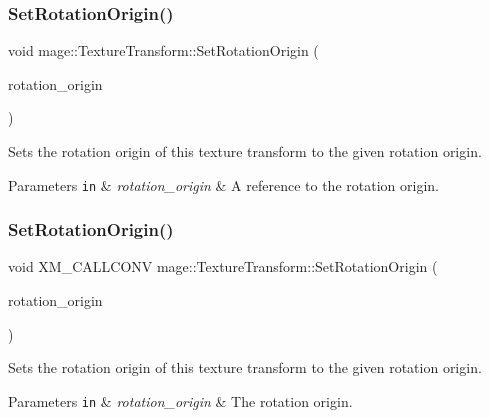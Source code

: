 \subsubsection{\texorpdfstring{Set\+Rotation\+Origin()}{SetRotationOrigin()}\hspace{0.1cm}{\footnotesize\ttfamily [3/4]}}
{\footnotesize\ttfamily void mage\+::\+Texture\+Transform\+::\+Set\+Rotation\+Origin (\begin{DoxyParamCaption}\item[{X\+M\+F\+L\+O\+A\+T2 \&\&}]{rotation\+\_\+origin }\end{DoxyParamCaption})\hspace{0.3cm}{\ttfamily [noexcept]}}

Sets the rotation origin of this texture transform to the given rotation origin.


\begin{DoxyParams}[1]{Parameters}
\mbox{\tt in}  & {\em rotation\+\_\+origin} & A reference to the rotation origin. \\
\hline
\end{DoxyParams}
\hypertarget{structmage_1_1_texture_transform_a41aebcbc263a678157081986a72f52af}{}\label{structmage_1_1_texture_transform_a41aebcbc263a678157081986a72f52af} 
\subsubsection{\texorpdfstring{Set\+Rotation\+Origin()}{SetRotationOrigin()}\hspace{0.1cm}{\footnotesize\ttfamily [4/4]}}
{\footnotesize\ttfamily void X\+M\+\_\+\+C\+A\+L\+L\+C\+O\+NV mage\+::\+Texture\+Transform\+::\+Set\+Rotation\+Origin (\begin{DoxyParamCaption}\item[{F\+X\+M\+V\+E\+C\+T\+OR}]{rotation\+\_\+origin }\end{DoxyParamCaption})\hspace{0.3cm}{\ttfamily [noexcept]}}

Sets the rotation origin of this texture transform to the given rotation origin.


\begin{DoxyParams}[1]{Parameters}
\mbox{\tt in}  & {\em rotation\+\_\+origin} & The rotation origin. \\
\hline
\end{DoxyParams}
\hypertarget{structmage_1_1_texture_transform_a2be885a521d72b115ca68b6de45aca7c}{}\label{structmage_1_1_texture_transform_a2be885a521d72b115ca68b6de45aca7c} 
